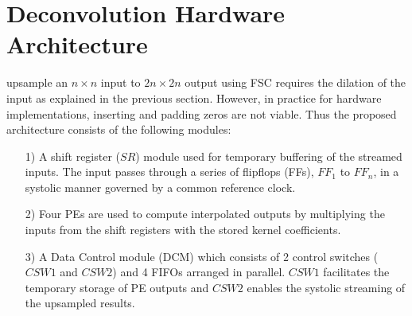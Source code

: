 \documentclass[journal]{IEEEtran}
\begin{document}
\section{Deconvolution Hardware Architecture}\label{sec:Deconvolution Hardware Architecture}
 upsample an $n\times n$ input to $2n\times2n$ output using FSC requires the dilation of the input as explained in the previous section. However, in practice for hardware implementations, inserting and padding zeros are not viable. Thus the proposed architecture consists of the following modules:
\begin{itemize}[leftmargin=*]
    \item[1)] A shift register ($SR$) module used for temporary buffering of the streamed inputs. The input passes through a series of  flipflops (FFs), $FF_1$ to $FF_n$, in a systolic manner governed by a common reference clock.
    \item[2)] Four PEs are used to compute interpolated outputs by multiplying the inputs from the shift registers with the stored kernel coefficients. 
    \item[3)] A Data Control module (DCM) which consists of 2 control switches ($CSW1$ and $CSW2$) and 4 FIFOs arranged in parallel. $CSW1$ facilitates the temporary storage of PE outputs and $CSW2$ enables the systolic streaming of the upsampled results. 
\end{itemize}
\end{document}

